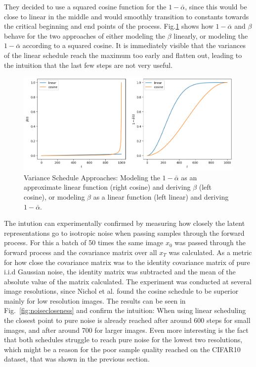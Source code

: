 They decided to use a squared cosine function for the $1-\bar{\alpha}$, since this would be close to linear in the middle and would smoothly transition to constants towards the critical beginning and end points of the process. Fig.\ref{fig:alphadash} shows how $1-\bar{\alpha}$ and $\beta$ behave for the two approaches of either modeling the $\beta$ linearly, or modeling the $1-\bar{\alpha}$ according to a squared cosine. It is immediately visible that the variances of the linear schedule reach the maximum too early and flatten out, leading to the intuition that the last few steps are not very useful.

\begin{figure}[h]
    \centering
    \includegraphics[width=.7\textwidth]{images/variance_schedule_alphadash.png}
    \caption{Variance Schedule Approaches: Modeling the $1-\bar{\alpha}$ as an approximate linear function (right cosine) and deriving $\beta$ (left cosine), or modeling $\beta$ as a linear function (left linear) and deriving $1-\bar{\alpha}$.}
    \label{fig:alphadash}
\end{figure}

The intution can experimentally confirmed by measuring how closely the latent representations go to isotropic noise when passing samples through the forward process. For this a batch of 50 times the same image $x_0$ was passed through the forward process and the covariance matrix over all $x_T$ was calculated. As a metric for how close the covariance matrix was to the identity covariance matrix of pure i.i.d Gaussian noise, the identity matrix was subtracted and the mean of the absolute value of the matrix calculated. The experiment was conducted at several image resolutions, since Nichol et al. found the cosine schedule to be superior mainly for low resolution images. The results can be seen in Fig.~\ref{fig:noisecloseness} and confirm the intuition: When using linear scheduling the closest point to pure noise is already reached after around 600 steps for small images, and after around 700 for larger images. Even more interesting is the fact that both schedules struggle to reach pure noise for the lowest two resolutions, which might be a reason for the poor sample quality reached on the CIFAR10 dataset, that was shown in the previous section.

